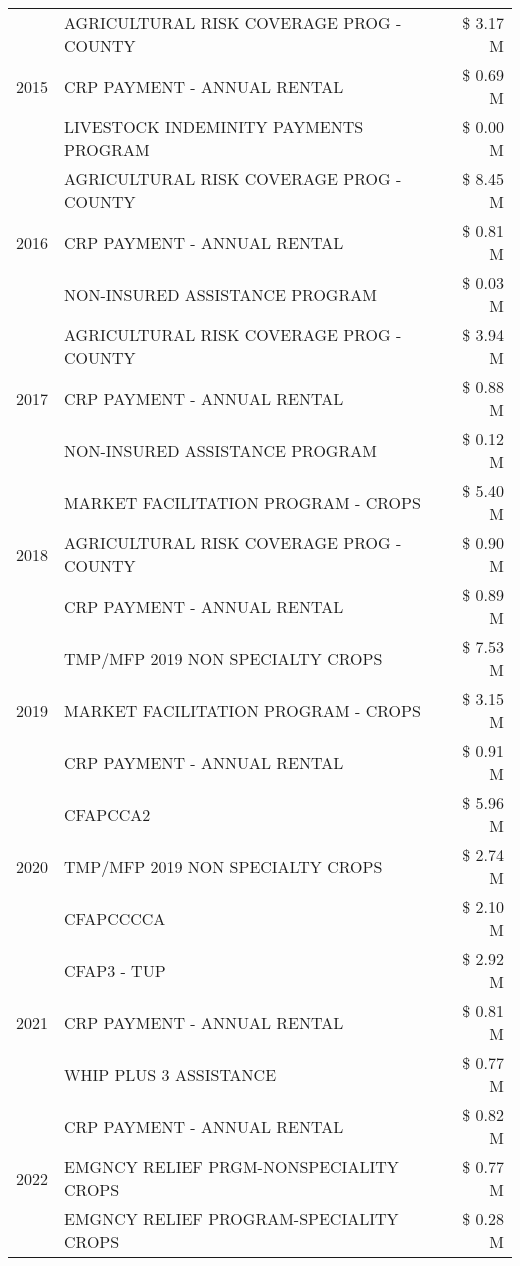 \begin{tabular}{llr}
\cline{1-3}
\multirow[t]{3}{*}{2015} & AGRICULTURAL RISK COVERAGE PROG - COUNTY & \$ 3.17 M \\
 & CRP PAYMENT - ANNUAL RENTAL & \$ 0.69 M \\
 & LIVESTOCK INDEMINITY PAYMENTS PROGRAM & \$ 0.00 M \\
\cline{1-3}
\multirow[t]{3}{*}{2016} & AGRICULTURAL RISK COVERAGE PROG - COUNTY & \$ 8.45 M \\
 & CRP PAYMENT - ANNUAL RENTAL & \$ 0.81 M \\
 & NON-INSURED ASSISTANCE PROGRAM & \$ 0.03 M \\
\cline{1-3}
\multirow[t]{3}{*}{2017} & AGRICULTURAL RISK COVERAGE PROG - COUNTY & \$ 3.94 M \\
 & CRP PAYMENT - ANNUAL RENTAL & \$ 0.88 M \\
 & NON-INSURED ASSISTANCE PROGRAM & \$ 0.12 M \\
\cline{1-3}
\multirow[t]{3}{*}{2018} & MARKET FACILITATION PROGRAM - CROPS & \$ 5.40 M \\
 & AGRICULTURAL RISK COVERAGE PROG - COUNTY & \$ 0.90 M \\
 & CRP PAYMENT - ANNUAL RENTAL & \$ 0.89 M \\
\cline{1-3}
\multirow[t]{3}{*}{2019} & TMP/MFP 2019 NON SPECIALTY CROPS & \$ 7.53 M \\
 & MARKET FACILITATION PROGRAM - CROPS & \$ 3.15 M \\
 & CRP PAYMENT - ANNUAL RENTAL & \$ 0.91 M \\
\cline{1-3}
\multirow[t]{3}{*}{2020} & CFAPCCA2 & \$ 5.96 M \\
 & TMP/MFP 2019 NON SPECIALTY CROPS & \$ 2.74 M \\
 & CFAPCCCCA & \$ 2.10 M \\
\cline{1-3}
\multirow[t]{3}{*}{2021} & CFAP3 - TUP & \$ 2.92 M \\
 & CRP PAYMENT - ANNUAL RENTAL & \$ 0.81 M \\
 & WHIP PLUS 3 ASSISTANCE & \$ 0.77 M \\
\cline{1-3}
\multirow[t]{3}{*}{2022} & CRP PAYMENT - ANNUAL RENTAL & \$ 0.82 M \\
 & EMGNCY RELIEF PRGM-NONSPECIALITY CROPS & \$ 0.77 M \\
 & EMGNCY RELIEF PROGRAM-SPECIALITY CROPS & \$ 0.28 M \\
\cline{1-3}
\bottomrule
\end{tabular}
